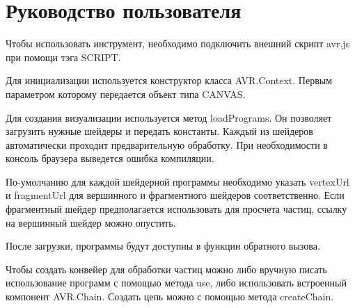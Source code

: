 \newpage
\section{Руководство пользователя}

Чтобы использовать инструмент, необходимо подключить внешний 
скрипт avr.js при помощи тэга SCRIPT.


Для инициализации используется конструктор класса AVR.Context. 
Первым параметром которому передается объект типа CANVAS.


Для создания визуализации используется метод loadPrograms. Он
позволяет загрузить нужные шейдеры и передать константы. Каждый
из шейдеров автоматически проходит предварительную обработку.
При необходимости в консоль браузера выведется ошибка компиляции.


По-умолчанию для каждой шейдерной программы необходимо указать
vertexUrl и fragmentUrl для вершинного и фрагментного шейдеров соответственно.
Если фрагментный шейдер предполагается использовать для просчета частиц,
ссылку на вершинный шейдер можно опустить.

   

После загрузки, программы будут доступны в функции обратного вызова.

Чтобы создать конвейер для обработки частиц можно либо вручную писать
использование программ с помощью метода use, либо использовать встроенный
компонент AVR.Chain. Создать цепь можно с помощью метода createChain.


